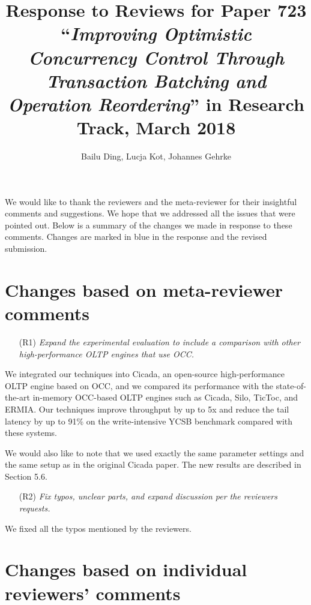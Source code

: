 \documentclass{article}
\newcommand{\changed}[1]{#1}
\newcommand{\changed}[1]{{\color{blue}#1}}
\begin{document}
\title{Response to Reviews for Paper 723 ``\emph{Improving Optimistic Concurrency Control Through Transaction Batching and Operation Reordering}'' in Research Track, March 2018}
\author{Bailu Ding, Lucja Kot, Johannes Gehrke}
\date{}
\maketitle

We would like to thank the reviewers and the meta-reviewer for their insightful comments and suggestions. We hope that we addressed all the issues that were pointed out. Below is a summary of the changes we made in response to these comments. Changes are marked in blue in the response and the revised submission.

\section{Changes based on meta-reviewer comments}


\begin{itemize}
	\item[(R1)] \emph{Expand the experimental evaluation to include a comparison with other high-performance OLTP engines that use OCC.}
\end{itemize}

\changed{
We integrated our techniques into Cicada, an open-source high-performance OLTP engine based on OCC, and we compared its performance with the state-of-the-art in-memory OCC-based OLTP engines such as Cicada, Silo, TicToc, and ERMIA. Our techniques improve throughput by up to 5x and reduce the tail latency by up to 91\% on the write-intensive YCSB benchmark compared with these systems.

We would also like to note that we used exactly the same parameter settings and the same setup as in the original Cicada paper. The new results are described in Section 5.6.
}

\begin{itemize}
	\item[(R2)] \emph{Fix typos, unclear parts, and expand discussion per the reviewers requests.}
\end{itemize}

\changed{
	We fixed all the typos mentioned by the reviewers.
}

\section{Changes based on individual reviewers' comments}
\end{document}
